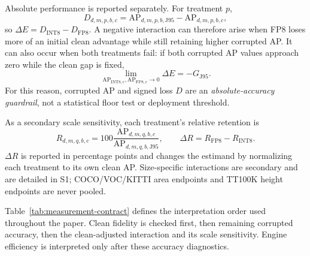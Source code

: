 \documentclass[a4paper,fleqn]{cas-dc}
\newcommand{\AP}{\mathrm{AP}}
\newcommand{\Jclean}{\mathrm{J95}}
\begin{document}
Absolute performance is reported separately. For treatment $p$,
\begin{equation}
D_{d,m,p,b,c}=\AP_{d,m,p,b,\Jclean}-\AP_{d,m,p,b,c},
\label{eq:d}
\end{equation}
so $\Delta E=D_{\mathrm{INT8}}-D_{\mathrm{FP8}}$. A negative interaction can therefore arise when FP8 loses more of an initial clean advantage while still retaining higher corrupted AP. It can also occur when both treatments fail: if both corrupted AP values approach zero while the clean gap is fixed,
\begin{equation}
\lim_{\AP_{\mathrm{INT8},c},\AP_{\mathrm{FP8},c}\to0}\Delta E=-G_{\Jclean}.
\label{eq:floor-limit}
\end{equation}
For this reason, corrupted AP and signed loss $D$ are an \emph{absolute-accuracy guardrail}, not a statistical floor test or deployment threshold.

As a secondary scale sensitivity, each treatment's relative retention is
\begin{equation}
R_{d,m,q,b,c}=100\frac{\AP_{d,m,q,b,c}}{\AP_{d,m,q,b,\Jclean}},\qquad
\Delta R=R_{\mathrm{FP8}}-R_{\mathrm{INT8}}.
\label{eq:delta-r}
\end{equation}
$\Delta R$ is reported in percentage points and changes the estimand by normalizing each treatment to its own clean AP. Size-specific interactions are secondary and are detailed in S1; COCO/VOC/KITTI area endpoints and TT100K height endpoints are never pooled.

Table~\ref{tab:measurement-contract} defines the interpretation order used throughout the paper. Clean fidelity is checked first, then remaining corrupted accuracy, then the clean-adjusted interaction and its scale sensitivity. Engine efficiency is interpreted only after these accuracy diagnostics.
\end{document}
